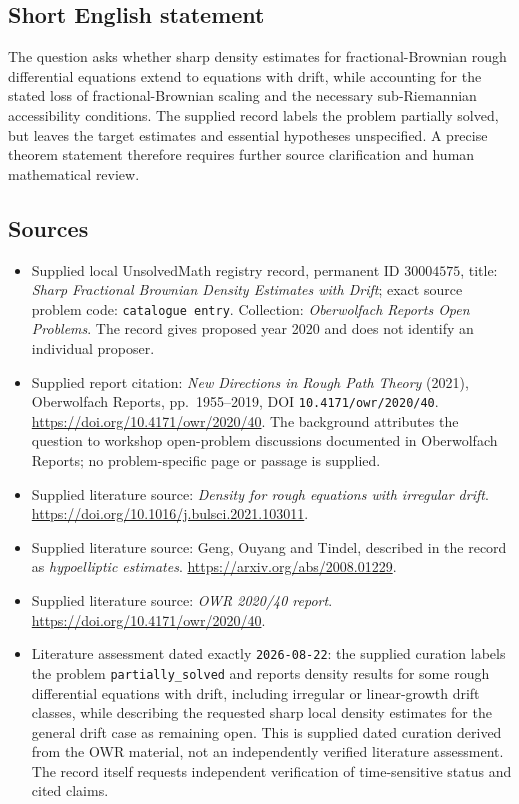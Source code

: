 \documentclass[11pt]{article}
\begin{document}
\subsection{Short English statement}
The question asks whether sharp density estimates for fractional-Brownian rough differential equations extend to equations with drift, while accounting for the stated loss of fractional-Brownian scaling and the necessary sub-Riemannian accessibility conditions. The supplied record labels the problem partially solved, but leaves the target estimates and essential hypotheses unspecified. A precise theorem statement therefore requires further source clarification and human mathematical review.
\subsection{Sources}
\begin{itemize}
\item Supplied local UnsolvedMath registry record, permanent ID \(30004575\), title: \emph{Sharp Fractional Brownian Density Estimates with Drift}; exact source problem code: \texttt{catalogue entry}. Collection: \emph{Oberwolfach Reports Open Problems}. The record gives proposed year 2020 and does not identify an individual proposer.
\item Supplied report citation: \emph{New Directions in Rough Path Theory} (2021), Oberwolfach Reports, pp.\ 1955--2019, DOI \texttt{10.4171/owr/2020/40}. \url{https://doi.org/10.4171/owr/2020/40}. The background attributes the question to workshop open-problem discussions documented in Oberwolfach Reports; no problem-specific page or passage is supplied.
\item Supplied literature source: \emph{Density for rough equations with irregular drift}. \url{https://doi.org/10.1016/j.bulsci.2021.103011}.
\item Supplied literature source: Geng, Ouyang and Tindel, described in the record as \emph{hypoelliptic estimates}. \url{https://arxiv.org/abs/2008.01229}.
\item Supplied literature source: \emph{OWR 2020/40 report}. \url{https://doi.org/10.4171/owr/2020/40}.
\item Literature assessment dated exactly \texttt{2026-08-22}: the supplied curation labels the problem \texttt{partially\_solved} and reports density results for some rough differential equations with drift, including irregular or linear-growth drift classes, while describing the requested sharp local density estimates for the general drift case as remaining open. This is supplied dated curation derived from the OWR material, not an independently verified literature assessment. The record itself requests independent verification of time-sensitive status and cited claims.
\end{itemize}
\end{document}
